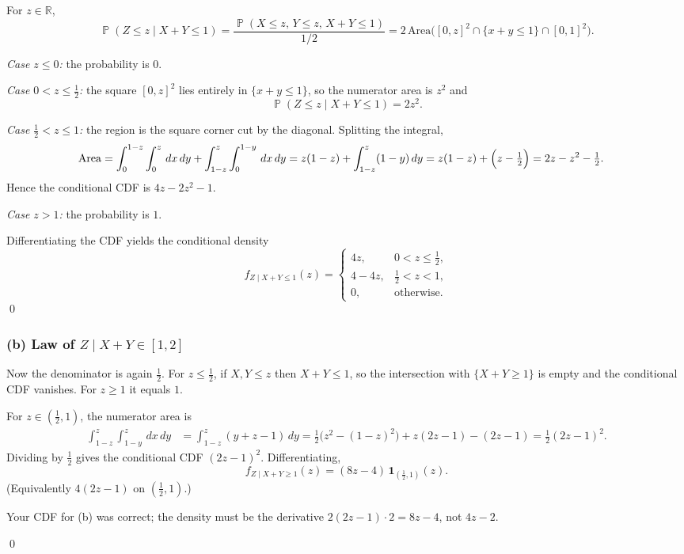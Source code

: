 \documentclass[11pt,a4paper]{article}
\DeclareMathOperator{\Pbb}{\mathbb{P}}
\begin{document}
For \(z\in\mathbb{R}\),
\[
\Pbb(Z\le z\mid X+Y\le 1)
=
\frac{\Pbb(X\le z,\,Y\le z,\,X+Y\le 1)}{1/2}
=
2\,\mathrm{Area}\bigl([0,z]^2\cap\{x+y\le 1\}\cap[0,1]^2\bigr).
\]

\textit{Case \(z\le 0\):} the probability is \(0\).

\textit{Case \(0<z\le\tfrac12\):} the square \([0,z]^2\) lies entirely in \(\{x+y\le 1\}\), so the numerator area is \(z^2\) and
\[
\Pbb(Z\le z\mid X+Y\le 1)=2z^2.
\]

\textit{Case \(\tfrac12<z\le 1\):} the region is the square corner cut by the diagonal. Splitting the integral,
\begin{align*}
\mathrm{Area}
&=
\int_0^{1-z}\int_0^z\,dx\,dy
+
\int_{1-z}^z\int_0^{1-y}\,dx\,dy
=
z(1-z)
+
\int_{1-z}^z(1-y)\,dy
=
z(1-z)+\Bigl(z-\tfrac12\Bigr)
=
2z-z^2-\tfrac12.
\end{align*}
Hence the conditional CDF is \(4z-2z^2-1\).

\textit{Case \(z>1\):} the probability is \(1\).

Differentiating the CDF yields the conditional density
\[
f_{Z\mid X+Y\le 1}(z)
=
\begin{cases}
4z,& 0<z\le\tfrac12,\\
4-4z,& \tfrac12<z<1,\\
0,& \text{otherwise}.
\end{cases}
\]
\qed

\subsubsection{(b) Law of \(Z\mid X+Y\in[1,2]\)}

Now the denominator is again \(\tfrac12\). For \(z\le\tfrac12\), if \(X,Y\le z\) then \(X+Y\le 1\), so the intersection with \(\{X+Y\ge 1\}\) is empty and the conditional CDF vanishes. For \(z\ge 1\) it equals \(1\).

For \(z\in(\tfrac12,1)\), the numerator area is
\begin{align*}
\int_{1-z}^z\int_{1-y}^z\,dx\,dy
&=
\int_{1-z}^z(y+z-1)\,dy
=
\tfrac12\bigl(z^2-(1-z)^2\bigr)+z(2z-1)-(2z-1)
=
\tfrac12(2z-1)^2.
\end{align*}
Dividing by \(\tfrac12\) gives the conditional CDF \((2z-1)^2\). Differentiating,
\[
f_{Z\mid X+Y\ge 1}(z)
=
(8z-4)\,\mathbf{1}_{(\frac12,1)}(z).
\]
(Equivalently \(4(2z-1)\) on \((\frac12,1)\).)

\begin{remark*}
Your CDF for (b) was correct; the density must be the derivative \(2(2z-1)\cdot 2=8z-4\), not \(4z-2\).
\end{remark*}
\qed
\end{document}

